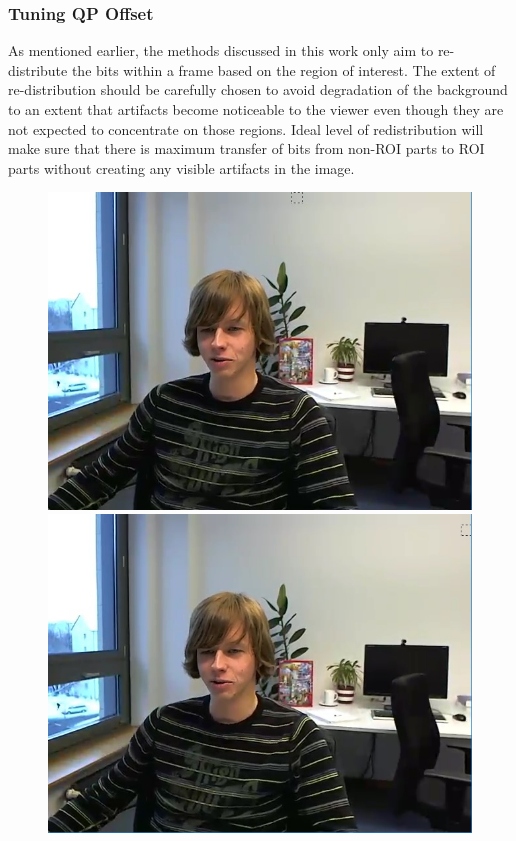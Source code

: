 \documentclass[11pt]{article} %
\begin{document}
\subsubsection{Tuning QP Offset} \label{sec:Tuning QP Offset}
As mentioned earlier, the methods discussed in this work only aim to re-distribute the bits within a frame based on the region of interest. The extent of re-distribution should be carefully chosen to avoid degradation of the background to an extent that artifacts become noticeable to the viewer even though they are not expected to concentrate on those regions. Ideal level of redistribution will make sure that there is maximum transfer of bits from non-ROI parts to ROI parts without creating any visible artifacts in the image.
\iffalse
\begin{figure}[!h]
    \centering
    \includegraphics[scale=0.43]{QPOffset/trialOffset/Paul250kbps_offset2}
    \includegraphics[scale=0.43]{QPOffset/trialOffset/Paul250kbps_offset4}

\end{figure}
\end{document}
